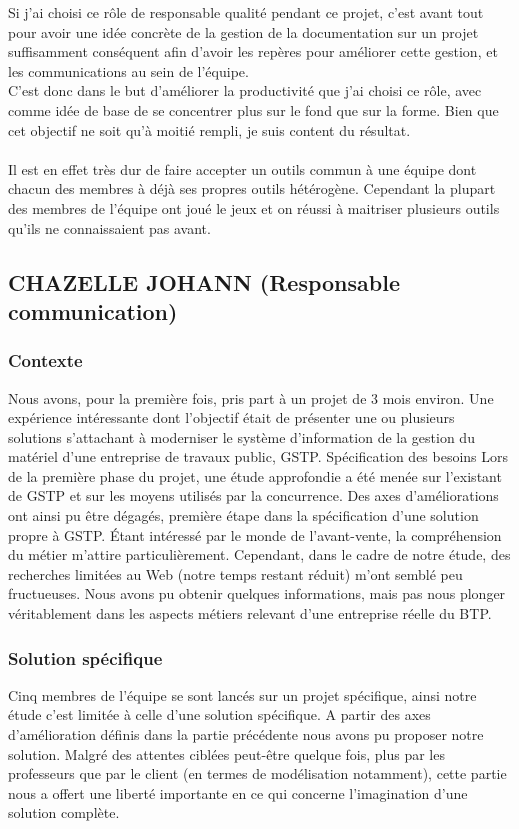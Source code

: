         Si j'ai choisi ce rôle de responsable qualité pendant ce projet, c'est avant tout pour avoir une idée concrète de la gestion de la documentation sur un projet suffisamment conséquent afin d'avoir les repères pour améliorer cette gestion, et les communications au sein de l'équipe.\\
        C'est donc dans le but d'améliorer la productivité que j'ai choisi ce rôle, avec comme idée de base de se concentrer plus sur le fond que sur la forme.
        Bien que cet objectif ne soit qu'à moitié rempli, je suis content du résultat.\\
        \\
        Il est en effet très dur de faire accepter un outils commun à une équipe dont chacun des membres à déjà ses propres outils hétérogène.
        Cependant la plupart des membres de l'équipe ont joué le jeux et on réussi à maitriser plusieurs outils qu'ils ne connaissaient pas avant.

    \subsection{CHAZELLE JOHANN (Responsable communication)}

        \subsubsection{Contexte}
        Nous avons, pour la première fois, pris part à un projet de 3 mois environ. Une expérience intéressante dont l’objectif était de présenter une ou plusieurs solutions s’attachant à moderniser le système d’information de la gestion du matériel d’une entreprise de travaux public, GSTP.
        Spécification des besoins
        Lors de la première phase du projet, une étude approfondie a été menée sur l’existant de GSTP et sur les moyens utilisés par la concurrence. Des axes d’améliorations ont ainsi pu être dégagés, première étape dans la spécification d’une solution propre à GSTP.
        Étant intéressé par le monde de l’avant-vente, la compréhension du métier m’attire particulièrement. Cependant, dans le cadre de notre étude, des recherches limitées au Web (notre temps restant réduit) m’ont semblé peu fructueuses. Nous avons pu obtenir quelques informations, mais pas nous plonger véritablement dans les aspects métiers relevant d’une entreprise réelle du BTP.

        \subsubsection{Solution spécifique}
        Cinq membres de l’équipe se sont lancés sur un projet spécifique, ainsi notre étude c’est limitée à celle d’une solution spécifique. A partir des axes d’amélioration définis dans la partie précédente nous avons pu proposer notre solution.
        Malgré des attentes ciblées peut-être quelque fois, plus par les professeurs que par le client (en termes de modélisation notamment), cette partie nous a offert une liberté importante en ce qui concerne l’imagination d’une solution complète.

